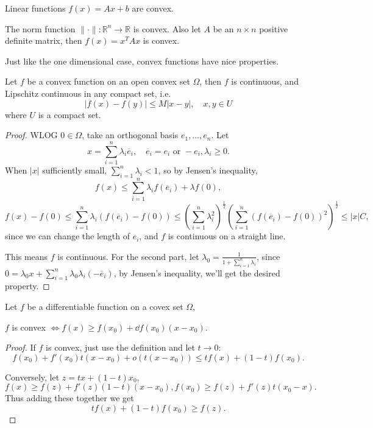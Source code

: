 \begin{example}
    Linear functions $f(x) = Ax + b$ are convex.

	The norm function $\lVert \cdot \rVert: \mathbb{R}^{n}\to \mathbb{R}$ is convex.
	Also let $A$ be an $n\times n$ positive definite matrix,
	then $f(x) = x^T A x$ is convex.
\end{example}

Just like the one dimensional case, convex functions have nice properties.
\begin{theorem}
    Let $f$ be a convex function on an open convex set $\Omega$,
	then $f$ is continuous, and Lipschitz continuous in any compact set, i.e.
	\[
	|f(x) - f(y)| \le M|x - y|,\quad x,y\in U
	\]
	where $U$ is a compact set.
\end{theorem}
\begin{proof}[Proof]
    WLOG $0\in \Omega$, take an orthogonal basis $e_1, \dots, e_n$.
	Let
	\[
	x = \sum_{i=1}^{n} \lambda_i \overline{e}_i, \quad \overline{e}_i
	= e_i \text{ or } -e_i, \lambda_i \ge 0.
	\]
	When $|x|$ sufficiently small, $\sum_{i=1}^n \lambda_i < 1$,
	so by Jensen's inequality,
	\[
	f(x) \le \sum_{i=1}^{n} \lambda_i f(\overline{e}_i) + \lambda f(0),
	\]
	\[
	f(x) - f(0) \le \sum_{i=1}^{n} \lambda_i(f(\overline{e}_i) - f(0))
	\le \left(\sum_{i=1}^{n} \lambda_i^2\right)^{\frac{1}{2}}
	\left(\sum_{i=1}^{n} (f(\overline{e}_i) - f(0)) ^2\right)^{\frac{1}{2}}
	\le |x| C,
	\]
	since we can change the length of $e_i$,
	and $f$ is continuous on a straight line.

	This means $f$ is continuous.
	For the second part, let $\lambda_0 = \frac{1}{1 + \sum_{i=1}^{n} \lambda_i}$,
	since $0 = \lambda_0 x + \sum_{i=1}^{n} \lambda_0 \lambda_i (- \overline{e}_i)$,
	by Jensen's inequality, we'll get the desired property.
\end{proof}

\begin{proposition}
	Let $f$ be a differentiable function on a covex set $\Omega$,

	$f$ is convex $\iff f(x) \ge f(x_0) + \dd f(x_0) (x - x_0)$.
\end{proposition}
\begin{proof}[Proof]
    If $f$ is convex,
	just use the definition and let $t\to 0$:
	\[
	f(x_0) + f'(x_0) t(x - x_0) + o(t(x - x_0)) \le tf(x) + (1-t) f(x_0).
	\]

	Conversely, let $z = tx + (1-t)x_0$,
	\[
	f(x) \ge f(z) + f'(z) (1-t)(x - x_0),
	f(x_0)\ge f(z) + f'(z) t(x_0 - x).
	\]
	Thus adding these together we get
	\[
	tf(x) + (1-t)f(x_0) \ge f(z).
	\]
\end{proof}

